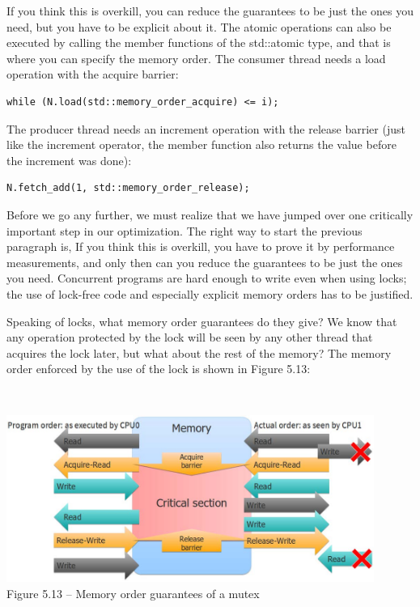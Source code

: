 If you think this is overkill, you can reduce the guarantees to be just the ones you need, but you have to be explicit about it. The atomic operations can also be executed by calling the member functions of the std::atomic type, and that is where you can specify the memory order. The consumer thread needs a load operation with the acquire barrier:

\begin{lstlisting}[style=styleCXX]
while (N.load(std::memory_order_acquire) <= i);
\end{lstlisting}

The producer thread needs an increment operation with the release barrier (just like the increment operator, the member function also returns the value before the increment was done):

\begin{lstlisting}[style=styleCXX]
N.fetch_add(1, std::memory_order_release);
\end{lstlisting}

Before we go any further, we must realize that we have jumped over one critically important step in our optimization. The right way to start the previous paragraph is, If you think this is overkill, you have to prove it by performance measurements, and only then can you reduce the guarantees to be just the ones you need. Concurrent programs are hard enough to write even when using locks; the use of lock-free code and especially explicit memory orders has to be justified.

Speaking of locks, what memory order guarantees do they give? We know that any operation protected by the lock will be seen by any other thread that acquires the lock later, but what about the rest of the memory? The memory order enforced by the use of the lock is shown in Figure 5.13:

\hspace*{\fill} \\ %
\begin{center}
\includegraphics[width=0.9\textwidth]{content/1/chapter5/images/13.jpg}\\
Figure 5.13 – Memory order guarantees of a mutex
\end{center}

